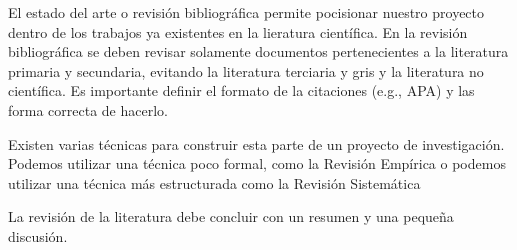 El estado del arte o revisión bibliográfica permite pocisionar nuestro proyecto dentro de los trabajos ya existentes en la lieratura científica. En la revisión bibliográfica se deben revisar solamente documentos pertenecientes a la literatura primaria y secundaria, evitando la literatura terciaria y gris y la literatura no científica. Es importante definir el formato de la citaciones (e.g., APA) y las forma correcta de hacerlo. 

 Existen varias técnicas para construir esta parte de un proyecto de investigación. Podemos utilizar una técnica poco formal, como la Revisión Empírica o podemos utilizar una técnica más estructurada como la Revisión Sistemática~\cite{moreno2018revisiones}

La revisión de la literatura debe concluir con un resumen y una pequeña discusión.